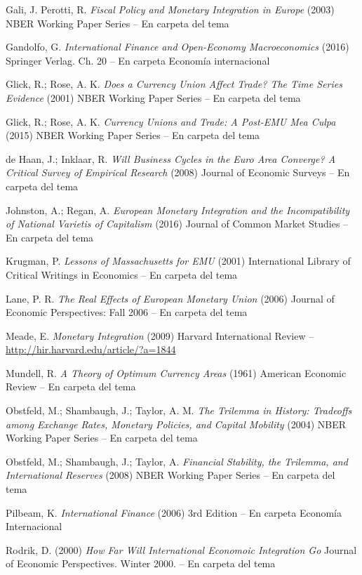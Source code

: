 \documentclass{nuevotema}
\begin{document}
Gali, J. Perotti, R. \textit{Fiscal Policy and Monetary Integration in Europe} (2003) NBER Working Paper Series -- En carpeta del tema

Gandolfo, G. \textit{International Finance and Open-Economy Macroeconomics} (2016) Springer Verlag. Ch. 20 -- En carpeta Economía internacional

Glick, R.; Rose, A. K. \textit{Does a Currency Union Affect Trade? The Time Series Evidence} (2001) NBER Working Paper Series -- En carpeta del tema

Glick, R.; Rose, A. K. \textit{Currency Unions and Trade: A Post-EMU Mea Culpa} (2015) NBER Working Paper Series -- En carpeta del tema

de Haan, J.; Inklaar, R. \textit{Will Business Cycles in the Euro Area Converge? A Critical Survey of Empirical Research} (2008) Journal of Economic Surveys -- En carpeta del tema

Johnston, A.; Regan, A. \textit{European Monetary Integration and the Incompatibility of National Varietis of Capitalism} (2016) Journal of Common Market Studies -- En carpeta del tema

Krugman, P. \textit{Lessons of Massachusetts for EMU} (2001) International Library of Critical Writings in Economics -- En carpeta del tema

Lane, P. R. \textit{The Real Effects of European Monetary Union} (2006) Journal of Economic Perspectives: Fall 2006 -- En carpeta del tema

Meade, E. \textit{Monetary Integration} (2009) Harvard International Review -- \url{http://hir.harvard.edu/article/?a=1844}

Mundell, R. \textit{A Theory of Optimum Currency Areas} (1961) American Economic Review -- En carpeta del tema

Obstfeld, M.; Shambaugh, J.; Taylor, A. M. \textit{The Trilemma in History: Tradeoffs among Exchange Rates, Monetary Policies, and Capital Mobility} (2004) NBER Working Paper Series -- En carpeta del tema

Obstfeld, M.; Shambaugh, J.; Taylor, A. \textit{Financial Stability, the Trilemma, and International Reserves} (2008) NBER Working Paper Series -- En carpeta del tema

Pilbeam, K. \textit{International Finance} (2006) 3rd Edition -- En carpeta Economía Internacional

Rodrik, D. (2000) \textit{How Far Will International Economoic Integration Go} Journal of Economic Perspectives. Winter 2000. -- En carpeta del tema
\end{document}
